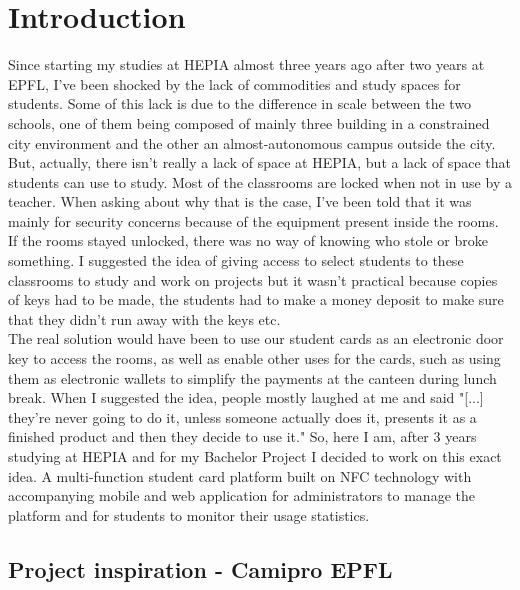 \documentclass[11pt,a4paper]{report}
\begin{document}
\chapter{Introduction}
Since starting my studies at HEPIA almost three years ago after two years at EPFL, I've been shocked by the lack of commodities and study spaces for students. Some of this lack is due to the difference in scale between the two schools, one of them being composed of mainly three building in a constrained city environment and the other an almost-autonomous campus outside the city. But, actually, there isn't really a lack of space at HEPIA, but a lack of space that students can use to study. Most of the classrooms are locked when not in use by a teacher. When asking about why that is the case, I've been told that it was mainly for security concerns because of the equipment present inside the rooms. If the rooms stayed unlocked, there was no way of knowing who stole or broke something. I suggested the idea of giving access to select students to these classrooms to study and work on projects but it wasn't practical because copies of keys had to be made, the students had to make a money deposit to make sure that they didn't run away with the keys etc.\\ 

The real solution would have been to use our student cards as an electronic door key to access the rooms, as well as enable other uses for the cards, such as using them as electronic wallets to simplify the payments at the canteen during lunch break. When I suggested the idea, people mostly laughed at me and said "[...] they're never going to do it, unless someone actually does it, presents it as a finished product and then they decide to use it." So, here I am, after 3 years studying at HEPIA and for my Bachelor Project I decided to work on this exact idea. A multi-function student card platform built on NFC technology with accompanying mobile and web application for administrators to manage the platform and for students to monitor their usage statistics.

\section{Project inspiration - Camipro EPFL}
\end{document}

